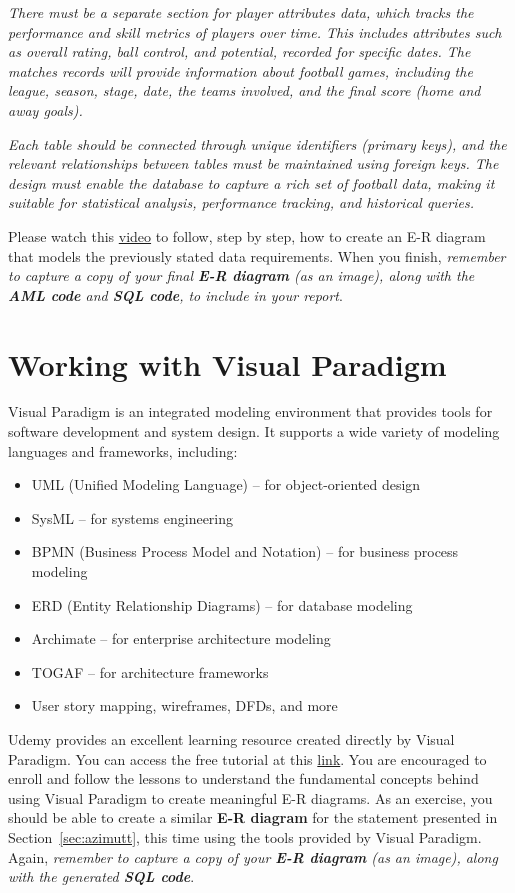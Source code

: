 \documentclass{article}
\begin{document}
\textit{There must be a separate section for player attributes data, which tracks the performance and skill metrics of players over time. This includes attributes such as overall rating, ball control, and potential, recorded for specific dates. The matches records will provide information about football games, including the league, season, stage, date, the teams involved, and the final score (home and away goals).}

\textit{Each table should be connected through unique identifiers (primary keys), and the relevant relationships between tables must be maintained using foreign keys. The design must enable the database to capture a rich set of football data, making it suitable for statistical analysis, performance tracking, and historical queries.}

Please watch this \href{https://drive.google.com/file/d/1e4SKyzVyXFkjLNyx0BBZxJIGoPUVN3d2/view?usp=sharing}{video} to follow, step by step, how to create an E-R diagram that models the previously stated data requirements. When you finish, \textit{remember to capture a copy of your final \textbf{E-R diagram} (as an image), along with the \textbf{AML code} and \textbf{SQL code}, to include in your report}.

\section{Working with Visual Paradigm} \label{sec:visual}
Visual Paradigm is an integrated modeling environment that provides tools for software development and system design. It supports a wide variety of modeling languages and frameworks, including:

\begin{itemize}
    \item UML (Unified Modeling Language) – for object-oriented design
    \item SysML – for systems engineering
    \item BPMN (Business Process Model and Notation) – for business process modeling
    \item ERD (Entity Relationship Diagrams) – for database modeling
    \item Archimate – for enterprise architecture modeling
    \item TOGAF – for architecture frameworks
    \item User story mapping, wireframes, DFDs, and more
\end{itemize}

Udemy provides an excellent learning resource created directly by Visual Paradigm. You can access the free tutorial at this \href{https://www.udemy.com/course/visual-paradigm-essential}{link}. You are encouraged to enroll and follow the lessons to understand the fundamental concepts behind using Visual Paradigm to create meaningful E-R diagrams. As an exercise, you should be able to create a similar \textbf{E-R diagram} for the statement presented in Section~\ref{sec:azimutt}, this time using the tools provided by Visual Paradigm. Again, \textit{remember to capture a copy of your \textbf{E-R diagram} (as an image), along with the generated \textbf{SQL code}}.
\end{document}
